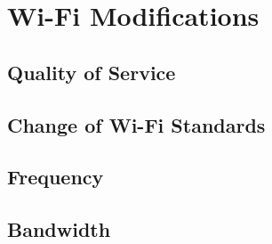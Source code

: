 \chapter{Wi-Fi Modifications} \label{sec:mod}
\section{Quality of Service}
\section{Change of Wi-Fi Standards}
\section{Frequency}
\section{Bandwidth}
